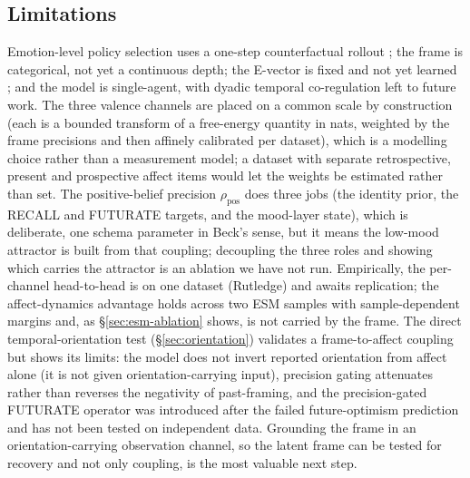 \documentclass[11pt,a4paper]{article}
\begin{document}
\subsection{Limitations}
Emotion-level policy selection uses a one-step counterfactual rollout
\citep{friston2018deep}; the frame is categorical, not yet a continuous depth; the
E-vector is fixed and not yet learned \citep{watkins2008constructive}; and the model is
single-agent, with dyadic temporal co-regulation \citep{hinrichs2025temporal} left to
future work. The three valence channels are placed on a common scale by construction
(each is a bounded transform of a free-energy quantity in nats, weighted by the frame
precisions and then affinely calibrated per dataset), which is a modelling choice
rather than a measurement model; a dataset with separate retrospective, present and
prospective affect items would let the weights be estimated rather than set. The
positive-belief precision $\rho_{\text{pos}}$ does three jobs (the identity prior, the
RECALL and FUTURATE targets, and the mood-layer state), which is deliberate, one schema
parameter in Beck's sense, but it means the low-mood attractor is built from that
coupling; decoupling the three roles and showing which carries the attractor is an
ablation we have not run. Empirically, the per-channel head-to-head is on one dataset
(Rutledge) and awaits replication; the affect-dynamics advantage holds across two ESM
samples with sample-dependent margins and, as \S\ref{sec:esm-ablation} shows, is not
carried by the frame. The direct temporal-orientation test (\S\ref{sec:orientation})
validates a frame-to-affect coupling but shows its limits: the model does not invert
reported orientation from affect alone (it is not given orientation-carrying input),
precision gating attenuates rather than reverses the negativity of past-framing, and
the precision-gated FUTURATE operator was introduced after the failed
future-optimism prediction and has not been tested on independent data. Grounding the
frame in an orientation-carrying observation channel, so the latent frame can be tested
for recovery and not only coupling, is the most valuable next step.



\end{document}
